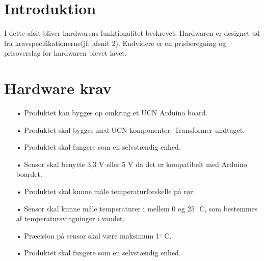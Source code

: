 \section{Introduktion}
I dette afsit bliver hardwarens funktionalitet beskrevet. Hardwaren er designet ud fra kravspecifikationerne(jf. afsnit 2). Endvidere er en prisberegning og prisoverslag for hardwaren blevet lavet.

\section{Hardware krav}
\begin{enumerate}
	\item[•]Produktet kan bygges op omkring et UCN Arduino board. 
	\item[•]Produktet skal bygges med UCN komponenter. Transformer undtaget.
	\item[•]Produktet skal fungere som en selvstændig enhed.
	\item[•]Sensor skal benytte 3,3 V eller 5 V da det er kompatibelt med Arduino boardet.
	\item[•]Produktet skal kunne måle temperaturforskelle på rør.
	\item[•]Sensor skal kunne måle temperaturer i mellem 0 og 25$^{\circ}$ C, som bestemmes af temperatursvingninger i vandet.
	\item[•]Præcision på sensor skal være maksimum 1$^{\circ}$ C.
	\item[•]Produktet skal fungere som en selvstændig enhed.
\end{enumerate}	
